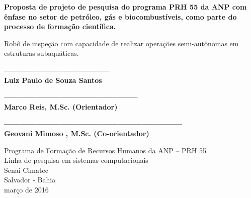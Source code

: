 
\setcounter{page}{1}

\newpage

\thispagestyle{empty}

\begin{center}
  \vspace*{0.8cm}
  {\Large \bf Proposta de projeto de pesquisa do programa PRH 55 da ANP com ênfase no setor de petróleo, gás e biocombustíveis, como parte do processo de formação científica.}

  \vspace*{2.5cm}

  {\Large Robô de inspeção com capacidade de realizar operações semi-autônomas em estruturas subaquáticas.}
           \vspace*{2.5cm}
  
  {\bf ---------------------------------------\\
  Luiz Paulo de Souza Santos}
  
  \vspace*{1.5cm}
  {\bf --------------------------------------------------\\
  Marco Reis, M.Sc. (Orientador)}
  
   \vspace*{1.5cm}
  {\bf ------------------------------------------------------------------\\
  Geovani Mimoso , M.Sc. (Co-orientador)}
  
   \begin{center}
   \end{center}
	\vspace*{- 0.3cm}

  {Programa de Formação de Recursos Humanos da ANP – PRH 55\\  
          [-0.3cm] Linha de pesquisa em sistemas computacionais\\
          [-3mm] Senai Cimatec\\
          [-3mm] Salvador - Bahia\\
          [-3mm] março de 2016}
\end{center}

